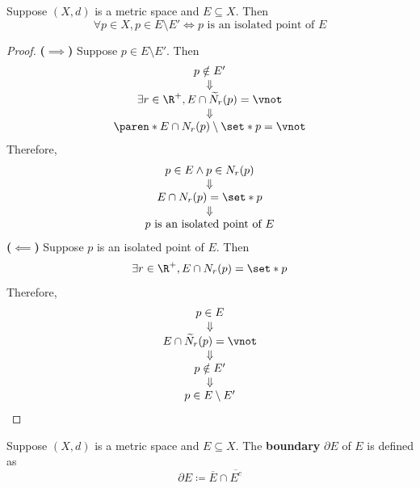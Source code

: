 \bigskip

\begin{theorem} \label{an:thm:isolated-points}
  Suppose $(X, d)$ is a metric space and $E \subseteq X$. Then
  \[
    \forall p \in X, p \in E \setminus E' \iff p \text{ is an isolated point of } E
  \]
\end{theorem}

\begin{proof}
  \textbf{($\implies$)} Suppose $p \in E \setminus E'$. Then
  \[
    \begin{array}{c}
      p \notin E'                                               \\
      \Downarrow                                                \\
      \exists r \in \R^{+}, E \cap \widetilde{N}_{r}(p) = \vnot \\
      \Downarrow                                                \\
      \paren*{E \cap N_{r}(p)} \setminus \set*{p} = \vnot
    \end{array}
  \]
  Therefore,
  \[
    \begin{array}{c}
      p \in E \land p \in N_{r}(p) \\
      \Downarrow                   \\
      E \cap N_{r}(p) = \set*{p}   \\
      \Downarrow                   \\
      p \text{ is an isolated point of } E
    \end{array}
  \]
  \textbf{($\impliedby$)} Suppose $p$ is an isolated point of $E$. Then
  \[
    \exists r \in \R^{+}, E \cap N_{r}(p) = \set*{p}
  \]
  Therefore,
  \[
    \begin{array}{c}
      p \in E                             \\
      \Downarrow                          \\
      E \cap \widetilde{N}_{r}(p) = \vnot \\
      \Downarrow                          \\
      p \notin E'                         \\
      \Downarrow                          \\
      p \in E \setminus E'
    \end{array}
  \]
\end{proof}

\bigskip

\begin{definition} \label{an:def:boundary}
  Suppose $(X, d)$ is a metric space and $E \subseteq X$. The \textbf{boundary} $\partial E$ of $E$ is defined as
  \[
    \partial E \coloneqq \overline{E} \cap \overline{E^{c}}
  \]
\end{definition}


